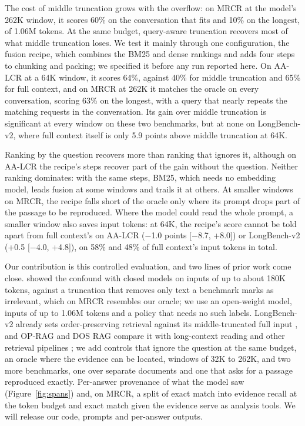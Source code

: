 \documentclass[letterpaper]{article} %
\newcommand{\recipe}{fusion recipe}
\begin{document}
The cost of middle truncation grows with the overflow: on MRCR at the model's 262K window, it scores 60\% on the conversation that fits and 10\% on the longest, of 1.06M tokens. At the same budget, query-aware truncation recovers most of what middle truncation loses. We test it mainly through one configuration, the \recipe{}, which combines the BM25 and dense rankings and adds four steps to chunking and packing; we specified it before any run reported here. On AA-LCR at a 64K window, it scores 64\%, against 40\% for middle truncation and 65\% for full context, and on MRCR at 262K it matches the oracle on every conversation, scoring 63\% on the longest, with a query that nearly repeats the matching requests in the conversation. Its gain over middle truncation is significant at every window on these two benchmarks, but at none on LongBench-v2, where full context itself is only 5.9 points above middle truncation at 64K.

Ranking by the question recovers more than ranking that ignores it, although on AA-LCR the recipe's steps recover part of the gain without the question. Neither ranking dominates: with the same steps, BM25, which needs no embedding model, leads fusion at some windows and trails it at others. At smaller windows on MRCR, the recipe falls short of the oracle only where its prompt drops part of the passage to be reproduced. Where the model could read the whole prompt, a smaller window also saves input tokens: at 64K, the recipe's score cannot be told apart from full context's on AA-LCR ($-$1.0 points [$-$8.7, +8.0]) or LongBench-v2 (+0.5 [$-$4.0, +4.8]), on 58\% and 48\% of full context's input tokens in total.

Our contribution is this controlled evaluation, and two lines of prior work come close. \citet{arjmandi2026distractor} showed the confound with closed models on inputs of up to about 180K tokens, against a truncation that removes only text a benchmark marks as irrelevant, which on MRCR resembles our oracle; we use an open-weight model, inputs of up to 1.06M tokens and a policy that needs no such labels. LongBench-v2 already sets order-preserving retrieval against its middle-truncated full input \cite{bai2025longbenchv2}, and OP-RAG and DOS RAG compare it with long-context reading and other retrieval pipelines \cite{yu2024oprag,laitenberger2025dosrag}; we add controls that ignore the question at the same budget, an oracle where the evidence can be located, windows of 32K to 262K, and two more benchmarks, one over separate documents and one that asks for a passage reproduced exactly. Per-answer provenance of what the model saw (Figure~\ref{fig:spans}) and, on MRCR, a split of exact match into evidence recall at the token budget and exact match given the evidence serve as analysis tools. We will release our code, prompts and per-answer outputs.
\end{document}
